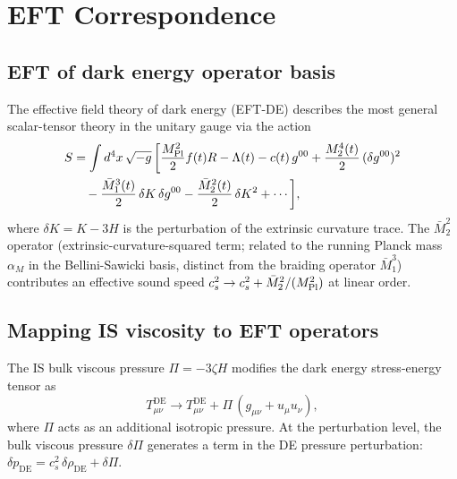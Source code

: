 \documentclass[12pt,a4paper]{article}
\begin{document}
\section{EFT Correspondence}
\label{sec:EFT}

\subsection{EFT of dark energy operator basis}
\label{subsec:EFT_basis}

The effective field theory of dark energy (EFT-DE) \citep{Horndeski1974,Gubitosi2013,Bellini2015}
describes the most general scalar-tensor theory in the unitary gauge via the action
\begin{align}
  S &= \int d^4x\,\sqrt{-g}\,\bigg[\frac{M_{\rm Pl}^2}{2}f(t)R
    - \Lambda(t) - c(t)\,g^{00}
    + \frac{M_2^4(t)}{2}\,(\delta g^{00})^2 \notag \\
  &\quad - \frac{\bar{M}_1^3(t)}{2}\,\delta K\,\delta g^{00}
    - \frac{\bar{M}_2^2(t)}{2}\,\delta K^2
    + \cdots \bigg],
  \label{eq:EFT_action}
\end{align}
where $\delta K = K - 3H$ is the perturbation of the extrinsic curvature trace.
The $\bar{M}_2^2$ operator (extrinsic-curvature-squared term; related to
the running Planck mass $\alpha_M$ in the Bellini-Sawicki basis, distinct
from the braiding operator $\bar{M}_1^3$) contributes an effective sound speed
$c^2_s \to c^2_s + \bar{M}_2^2/(M_{\rm Pl}^2)$ at linear order.

\subsection{Mapping IS viscosity to EFT operators}
\label{subsec:EFT_mapping}

The IS bulk viscous pressure $\Pi = -3\zeta H$ modifies the dark energy
stress-energy tensor as
\begin{equation}
  T^{\mathrm{DE}}_{\mu\nu} \to T^{\mathrm{DE}}_{\mu\nu}
  + \Pi\,(g_{\mu\nu} + u_\mu u_\nu),
\end{equation}
where $\Pi$ acts as an additional isotropic pressure.
At the perturbation level, the bulk viscous pressure $\delta\Pi$ generates
a term in the DE pressure perturbation:
$\delta p_{\mathrm{DE}} = c^2_s\,\delta\rho_{\mathrm{DE}} + \delta\Pi$.
\end{document}
